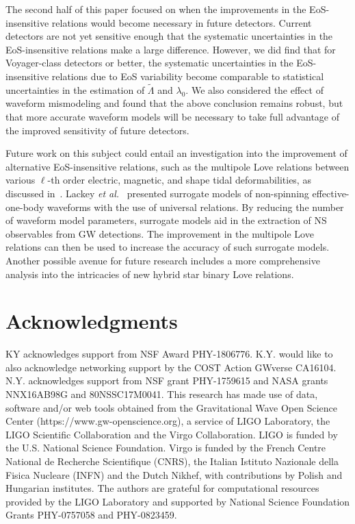 \documentclass[prd,twocolumn,nofootinbib,superscriptaddress,amsmath,amssymb]{revtex4-1}
\begin{document}
The second half of this paper focused on when the improvements in the EoS-insensitive relations would become necessary in future detectors. Current detectors are not yet sensitive enough that the systematic uncertainties in the EoS-insensitive relations make a large difference. However, we did find that for Voyager-class detectors or better, the systematic uncertainties in the EoS-insensitive relations due to EoS variability become comparable to statistical uncertainties in the estimation of $\tilde{\Lambda}$ and $\lambda_{0}$. We also considered the effect of waveform mismodeling and found that the above conclusion remains robust, but that more accurate waveform models will be necessary to take full advantage of the improved sensitivity of future detectors. 

Future work on this subject could entail an investigation into the improvement of alternative EoS-insensitive relations, such as the multipole Love relations between various $\ell$-th order electric, magnetic, and shape tidal deformabilities, as discussed in~\cite{Yagi:Multipole}. Lackey \emph{et al.}~\cite{Lackey:Surrogate, Lackey:EOB} presented surrogate models of non-spinning effective-one-body waveforms with the use of universal relations. By reducing the number of waveform model parameters, surrogate models aid in the extraction of NS observables from GW detections. The improvement in the multipole Love relations can then be used to increase the accuracy of such surrogate models. Another possible avenue for future research includes a more comprehensive analysis into the intricacies of new hybrid star binary Love relations.


\section*{Acknowledgments}\label{acknowledgments}
KY acknowledges support from NSF Award PHY-1806776. 
K.Y. would like to also acknowledge networking support by the COST Action GWverse CA16104.
N.Y. acknowledges support from  NSF grant PHY-1759615 and NASA grants NNX16AB98G and 80NSSC17M0041.
%
This research has made use of data, software and/or web tools obtained from the Gravitational Wave Open Science Center (https://www.gw-openscience.org), a service of LIGO Laboratory, the LIGO Scientific Collaboration and the Virgo Collaboration. LIGO is funded by the U.S. National Science Foundation. Virgo is funded by the French Centre National de Recherche Scientifique (CNRS), the Italian Istituto Nazionale della Fisica Nucleare (INFN) and the Dutch Nikhef, with contributions by Polish and Hungarian institutes.
%
The authors are grateful for computational resources provided by the LIGO Laboratory and supported by National Science Foundation Grants PHY-0757058 and PHY-0823459.  
\end{document}
